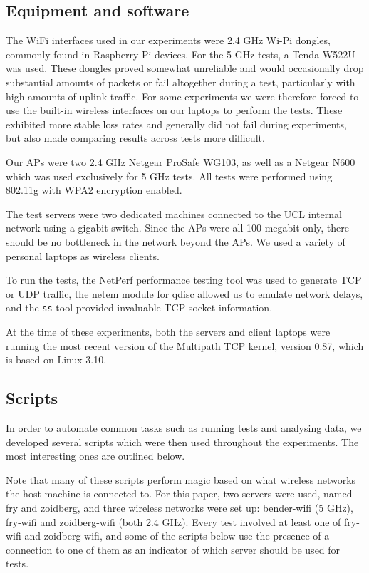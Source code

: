 \subsection{Equipment and software}
\label{sec:met:equip}
The WiFi interfaces used in our experiments were 2.4 GHz Wi-Pi dongles, commonly
found in Raspberry Pi devices. For the 5 GHz tests, a Tenda W522U was used.
These dongles proved somewhat unreliable and would occasionally drop substantial
amounts of packets or fail altogether during a test, particularly with high
amounts of uplink traffic. For some experiments we were therefore forced to use
the built-in wireless interfaces on our laptops to perform the tests. These
exhibited more stable loss rates and generally did not fail during experiments,
but also made comparing results across tests more difficult.

Our APs were two 2.4 GHz Netgear ProSafe WG103, as well as a Netgear N600 which
was used exclusively for 5 GHz tests. All tests were performed using 802.11g
with WPA2 encryption enabled.

The test servers were two dedicated machines connected to the UCL internal
network using a gigabit switch. Since the APs were all 100 megabit only, there
should be no bottleneck in the network beyond the APs. We used a variety of
personal laptops as wireless clients.

To run the tests, the NetPerf performance testing tool was used to generate TCP
or UDP traffic, the netem module for qdisc allowed us to emulate network delays,
and the \texttt{ss} tool provided invaluable TCP socket information.

At the time of these experiments, both the servers and client laptops were
running the most recent version of the Multipath TCP kernel, version 0.87, which
is based on Linux 3.10.

\subsection{Scripts}
\label{sec:met:scripts}
In order to automate common tasks such as running tests and analysing data, we
developed several scripts which were then used throughout the experiments. The
most interesting ones are outlined below.

Note that many of these scripts perform magic based on what wireless networks
the host machine is connected to. For this paper, two servers were used, named
fry and zoidberg, and three wireless networks were set up: bender-wifi (5 GHz),
fry-wifi and zoidberg-wifi (both 2.4 GHz). Every test involved at least one of
fry-wifi and zoidberg-wifi, and some of the scripts below use the presence of a
connection to one of them as an indicator of which server should be used for
tests.

